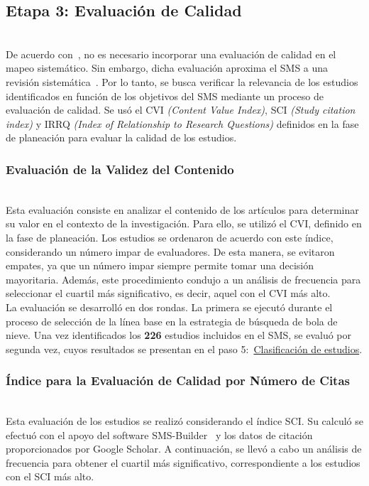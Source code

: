 \subsection{Etapa 3: Evaluación de Calidad}
\mbox{}\\
De acuerdo con~\cite{8747000}, no es necesario incorporar una evaluación de calidad en el mapeo sistemático. Sin embargo, dicha evaluación aproxima el SMS a una revisión sistemática~\cite{10.1145/2601248.2601268}. Por lo tanto, se busca verificar la relevancia de los estudios identificados en función de los objetivos del SMS mediante un proceso de evaluación de calidad. Se usó el CVI \textit{(Content Value Index)}, SCI \textit{(Study citation index)} y IRRQ \textit{(Index of Relationship to Research Questions)} definidos en la fase de planeación para evaluar la calidad de los estudios.\\

\subsubsection{Evaluación de la Validez del Contenido}
\mbox{}\\
Esta evaluación consiste en analizar el contenido de los artículos para determinar su valor en el contexto de la investigación. Para ello, se utilizó el CVI, definido en la fase de planeación.
Los estudios se ordenaron de acuerdo con este índice, considerando un número impar de evaluadores. De esta manera, se evitaron empates, ya que un número impar siempre permite tomar una decisión mayoritaria. Además, este procedimiento condujo a un análisis de frecuencia para seleccionar el cuartil más significativo, es decir, aquel con el CVI más alto. \\
La evaluación se desarrolló en dos rondas. La primera se ejecutó durante el proceso de selección de la línea base en la estrategia de búsqueda de bola de nieve. Una vez identificados los \textbf{226} estudios incluidos en el SMS, se evaluó por segunda vez, cuyos resultados se presentan en el paso 5:~\hyperref[sec:clasificacion-estudios]{Clasificación de estudios}.\\

\subsubsection{Índice para la Evaluación de Calidad por Número de Citas}
\mbox{}\\
Esta evaluación de los estudios se realizó considerando el índice SCI. Su calculó se efectuó con el apoyo del software SMS-Builder~\cite{candela2020smsbuilder} y los datos de citación proporcionados por Google Scholar. A continuación, se llevó a cabo un análisis de frecuencia para obtener el cuartil más significativo, correspondiente a los estudios con el SCI más alto. \\

